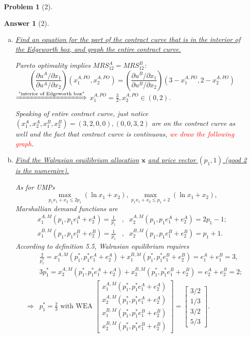 \documentclass{article}
\newtheorem*{ans}{Answer}
\newtheorem*{prob}{{\bf Problem}}
\newcommand{\1}{{\bf 1}}
\newcommand{\0}{{\mathbf{0}}}
\newcommand{\x}{{\mathbf{x}}}
\newcommand{\<}{\langle}
\renewcommand{\>}{\rangle}
\begin{document}
\begin{prob}[2]
	

\end{prob}
\begin{ans}[2]  
	
\begin{enumerate}[(a)]
	\item
\ul{Find an equation for the part of the contract curve that is in the interior of the Edgeworth box, and graph the entire contract curve.}

Pareto optimality implies $MRS^A_{12} = MRS^B_{12}$:
$$\left(\frac{ \partial u^A / \partial x_1}{ \partial u^{A } / \partial x_2}\right)\left(x_1^{A,PO},x_2^{A,PO}\right) = \left(\frac{ \partial u^B / \partial x_1}{ \partial u^B / \partial x_2}\right) \left( 3 - x_1^{A,PO}, 2 - x_2^{A,PO}\right)$$ $ \xLongrightarrow{\text{"interior of Edgeworth box"}}$ $x_1^{A,PO} = \frac32, x_2^{A,PO } \in (0,2)$.

Speaking of entire contract curve, just notice $\left(x_1^A,x_2^A , x_1^B,x_2^B\right) = (3,2,0,0),(0,0,3,2)$ are on the contract curve as well and the fact that contract curve is continuous, \textcolor{red}{we draw the following graph}.
\newpage 
	\item \ul{Find the Walrasian equilibrium allocation} $\x$ \ul{and price vector $(p_1,1)$ (good 2 is the numeraire).}
	
As for UMPs
$$
\max_{p_1 x_1 +x_2 \le 2p_1} \left(\ln x_1 + x_2\right), \max_{p_1 x_1 +x_2 \le p_1  +2} \left(\ln x_1 + x_2 \right),
$$
Marshallian demand functions are \begin{eqnarray*}
	x_1^{A,M} \left( p_1, p_1 e_1^A + e_2^A \right) = \frac1{p_1}&,& x_2^{A,M} \left( p_1, p_1 e_1^A + e_2^A \right)= 2 p_1 -1;\\
	x_1^{B,M} \left( p_1, p_1 e_1^B + e_2^B \right) = \frac1{p_1}&,& x_2^{B,M} \left( p_1, p_1 e_1^B + e_2^B \right) = p_1 + 1.
\end{eqnarray*} According to definition 5.5, Walrasian equilibrium requires 
\begin{eqnarray*}
&&\frac2{p_1^* } = x_1^{A,M} \left(p_1^* , p_1^* e_1^A + e_2^A \right)+ x_1^{B,M} \left(p_1^*, p_1^* e_1^B + e_2^B \right) = e_1^A + e_1^B= 3,  \\
&& 3p_1^* = x_2^{A,M} \left(p_1^*, p_1^* e_1^A + e_2^A \right)+ x_2^{B,M} \left(p_1^*, p_1^* e_1^B + e_2^B \right) = e_2^A + e_2^B= 2; \\ 
& \Rightarrow & p_1^* = \frac23 \text{ with WEA }
\begin{bmatrix} x_1^{A,M} \left( p_1^*, p_1^* e_1^A + e_2^A \right)  \\ x_2^{A,M} \left( p_1^*, p_1^* e_1^A + e_2^A \right)  \\ x_1^{B,M} \left( p_1^*, p_1^* e_1^B + e_2^B \right)  \\ x_2^{B,M} \left( p_1^*, p_1^* e_1^B + e_2^B \right) \end{bmatrix}   = \begin{bmatrix}
3/2 \\ 1/3 \\ 3/2 \\ 5/3
\end{bmatrix} .
\end{eqnarray*}


\end{enumerate}
\end{ans}
\end{document}
